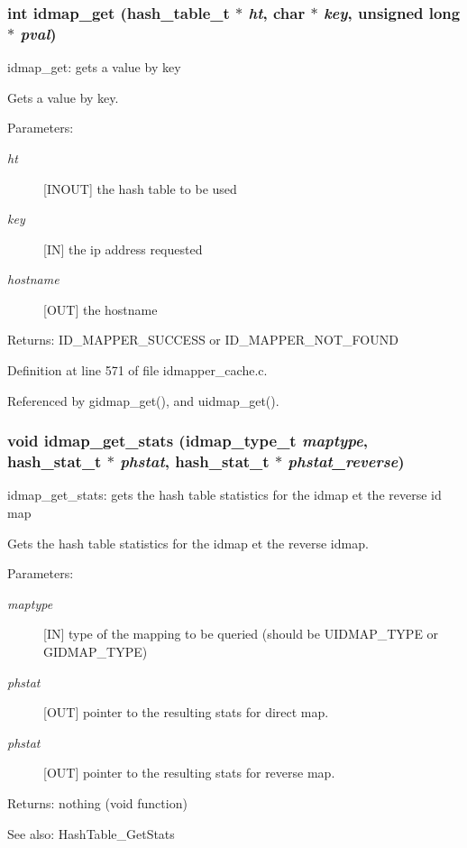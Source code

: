 \subsubsection{\setlength{\rightskip}{0pt plus 5cm}int idmap\_\-get (hash\_\-table\_\-t $\ast$ {\em ht}, char $\ast$ {\em key}, unsigned long $\ast$ {\em pval})}\label{idmapper__cache_8c_a25}


idmap\_\-get: gets a value by key

Gets a value by key.

\begin{Desc}
\item[Parameters:]
\begin{description}
\item[{\em ht}][INOUT] the hash table to be used \item[{\em key}][IN] the ip address requested \item[{\em hostname}][OUT] the hostname\end{description}
\end{Desc}
\begin{Desc}
\item[Returns:]ID\_\-MAPPER\_\-SUCCESS or ID\_\-MAPPER\_\-NOT\_\-FOUND \end{Desc}


Definition at line 571 of file idmapper\_\-cache.c.

Referenced by gidmap\_\-get(), and uidmap\_\-get().
\subsubsection{\setlength{\rightskip}{0pt plus 5cm}void idmap\_\-get\_\-stats (idmap\_\-type\_\-t {\em maptype}, hash\_\-stat\_\-t $\ast$ {\em phstat}, hash\_\-stat\_\-t $\ast$ {\em phstat\_\-reverse})}\label{idmapper__cache_8c_a38}


idmap\_\-get\_\-stats: gets the hash table statistics for the idmap et the reverse id map

Gets the hash table statistics for the idmap et the reverse idmap.

\begin{Desc}
\item[Parameters:]
\begin{description}
\item[{\em maptype}][IN] type of the mapping to be queried (should be UIDMAP\_\-TYPE or GIDMAP\_\-TYPE) \item[{\em phstat}][OUT] pointer to the resulting stats for direct map. \item[{\em phstat}][OUT] pointer to the resulting stats for reverse map.\end{description}
\end{Desc}
\begin{Desc}
\item[Returns:]nothing (void function)\end{Desc}
\begin{Desc}
\item[See also:]Hash\-Table\_\-Get\-Stats \end{Desc}


